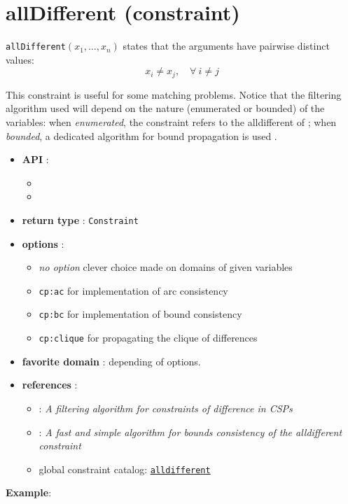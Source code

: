 \label{alldifferent}
\hypertarget{alldifferent}{}

\section{allDifferent (constraint)}\label{alldifferent:alldifferentconstraint}\hypertarget{alldifferent:alldifferentconstraint}{}
\begin{notedef}
  \texttt{allDifferent}$(x_1,\ldots,x_n)$ states that the arguments have pairwise distinct values:
 $$x_i \neq x_j,\quad \forall\ i\neq j$$  
\end{notedef}
This constraint is useful for some matching problems.
Notice that the filtering algorithm used will depend on the nature (enumerated or bounded) of the variables: 
when \emph{enumerated}, the constraint refers to the alldifferent of \cite{ReginAAAI94};
when \emph{bounded}, a dedicated algorithm for bound propagation is used \cite{LopezIJCAI03}.

\begin{itemize}
	\item \textbf{API} :
	\begin{itemize}
		\item {}
		\item {}
	\end{itemize}
	\item \textbf{return type} : \texttt{Constraint}
	\item \textbf{options} :
	\begin{itemize}
		\item \emph{no option} clever choice made on domains of given variables
		\item \texttt{cp:ac} for \cite{ReginAAAI94} implementation of arc consistency
		\item \texttt{cp:bc} for \cite{LopezIJCAI03} implementation of bound consistency
		\item \texttt{cp:clique} for propagating the clique of differences
	\end{itemize}
	\item \textbf{favorite domain} : depending of options.
	\item \textbf{references} :
      \begin{itemize}
      \item  \cite{ReginAAAI94}: \emph{A filtering algorithm for constraints of difference in CSPs}
      \item  \cite{LopezIJCAI03}: \emph{A fast and simple algorithm for bounds consistency of the alldifferent constraint}
      \item global constraint catalog: \href{http://www.emn.fr/x-info/sdemasse/gccat/Calldifferent.html}{\tt alldifferent}
      \end{itemize}
\end{itemize}



\textbf{Example}:

